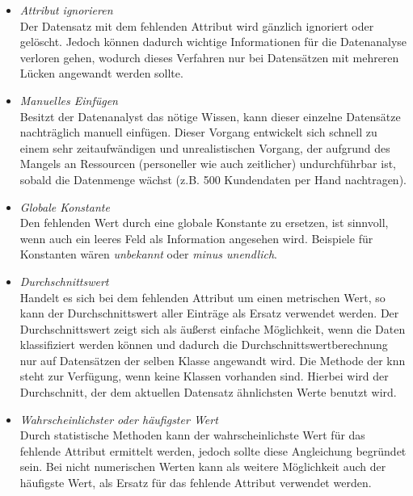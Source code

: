 \begin{itemize}
\item \textit{Attribut ignorieren}
\\ Der Datensatz mit dem fehlenden Attribut wird gänzlich ignoriert oder gelöscht. Jedoch können dadurch wichtige Informationen für die Datenanalyse verloren gehen, wodurch dieses Verfahren nur bei Datensätzen mit mehreren Lücken angewandt werden sollte.

\item \textit{Manuelles Einfügen}
\\ Besitzt der Datenanalyst das nötige Wissen, kann dieser einzelne Datensätze nachträglich manuell einfügen. Dieser Vorgang entwickelt sich schnell zu einem sehr zeitaufwändigen und unrealistischen Vorgang, der aufgrund des Mangels an Ressourcen (personeller wie auch zeitlicher) undurchführbar ist, sobald die Datenmenge wächst (z.B. 500 Kundendaten per Hand nachtragen).

\item \textit{Globale Konstante}
\\ Den fehlenden Wert durch eine globale Konstante zu ersetzen, ist sinnvoll, wenn auch ein leeres Feld als Information angesehen wird. Beispiele für Konstanten wären \textit{unbekannt} oder \textit{minus unendlich}.

\item \textit{Durchschnittswert}
\\ Handelt es sich bei dem fehlenden Attribut um einen metrischen Wert, so kann der Durchschnittswert aller Einträge als Ersatz verwendet werden. Der Durchschnittswert zeigt sich als äußerst einfache Möglichkeit, wenn die Daten klassifiziert werden können und dadurch die Durchschnittswertberechnung nur auf Datensätzen der selben Klasse angewandt wird. Die Methode der \gls{knn} steht zur Verfügung, wenn keine Klassen vorhanden sind. Hierbei wird der Durchschnitt, der dem aktuellen Datensatz ähnlichsten Werte benutzt wird.

\item \textit{Wahrscheinlichster oder häufigster Wert}
\\ Durch statistische Methoden kann der wahrscheinlichste Wert für das fehlende Attribut ermittelt werden, jedoch sollte diese Angleichung begründet sein. Bei nicht numerischen Werten kann als weitere Möglichkeit auch der häufigste Wert, als Ersatz für das fehlende Attribut verwendet werden.
\end{itemize}


